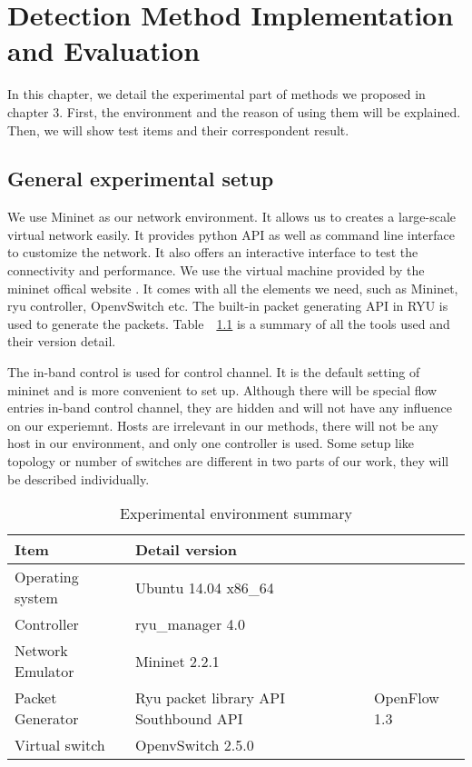 \chapter{Detection Method Implementation and Evaluation}
In this chapter, we detail the experimental part of methods we proposed in chapter 3. First, the environment and the reason of using them will be explained. Then, we will show test items and their correspondent result.

\section{General experimental setup}
We use Mininet as our network environment. It allows us to creates a large-scale virtual network easily. 
It provides python API as well as command line interface to customize the network. It also offers an interactive interface to test the connectivity and performance. We use the virtual machine provided by the mininet offical website \cite{Mininet}. It comes with all the elements we need, such as Mininet, ryu controller, OpenvSwitch etc. The built-in packet generating API in RYU is used to generate the packets. Table~~\ref{table:Experiment_table} is a summary of all the tools used and their version detail. 

The in-band control is used for control channel. It is the default setting of mininet and is more convenient to set up. Although there will be special flow entries in-band control channel, they are hidden and will not have any influence on our experiemnt. Hosts are irrelevant in our methods, there will not be any host in our environment, and only one controller is used. Some setup like topology or number of switches are different in two parts of our work, they will be described individually.

\begin{table}[H]
\centering
\caption{Experimental environment summary}
\begin{tabular}{|l|p{4cm}|p{4.5cm}}
\hline Item & Detail version \\
\hline Operating system & Ubuntu 14.04 x86\_64 \\
\hline Controller & ryu\_manager 4.0 \\
\hline Network Emulator & Mininet 2.2.1 \\
\hline Packet Generator & Ryu packet library API
\hline Southbound API & OpenFlow 1.3 \\
\hline Virtual switch & OpenvSwitch 2.5.0 \\
\hline 
\end{tabular}
\label{table:Experiment_table}
\end{table}

